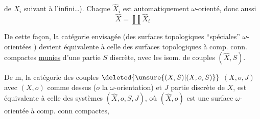 de $X_i$ suivant  à l'infini\ldots). Chaque $\hat X_i$ est automatiquement $\omega$-orienté, donc aussi
\[
\hat X=\coprod\hat X_i
\]

De cette façon, la catégorie envisagée (des surfaces topologiques ``spéciales'' $\omega$-orientées ) devient équivalente à celle des surfaces topologiques  à comp. conn. compactes \uline{munies} d'une partie  $S$ discrète, avec les isom. de couples $(\hat X,S)$.

De $\overline{\mathrm m}$, la catégorie des couples $\deleted{\unsure{(X,S)|(X,o,S)}}$ $(X,o,J)$ avec $(X,o)$ comme dessus ($o$ la $\omega$-orientation) et $J$ partie discrète de $X$, est équivalente à celle des systèmes $(\hat X,o,S,J)$, où $(\hat X,o)$ est une surface $\omega$-orientée à comp. conn compactes,
